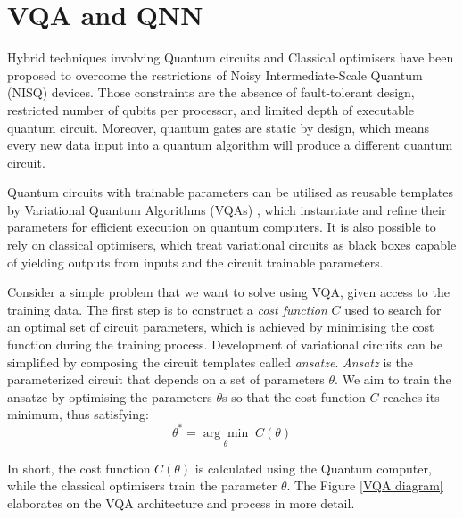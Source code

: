 \section{VQA and QNN}

Hybrid techniques involving Quantum circuits and Classical optimisers have been proposed to overcome the restrictions of Noisy Intermediate-Scale Quantum (NISQ) \cite{brooksQuantumSupremacyHunt2019} devices. 
Those constraints are the absence of fault-tolerant design, restricted number of qubits per processor, and limited depth of executable quantum circuit. 
Moreover, quantum gates are static by design, which means every new data input into a quantum algorithm will produce a different quantum circuit.

Quantum circuits with trainable parameters can be utilised as reusable templates by Variational Quantum Algorithms (VQAs) \cite{cerezo2021variational}, which instantiate and refine their parameters for efficient execution on quantum computers.
It is also possible to rely on classical optimisers, which treat variational circuits as black boxes capable of yielding outputs from inputs and the circuit trainable parameters.

Consider a simple problem that we want to solve using VQA, given access to the training data.
The first step is to construct a \textit{cost function} $C$ used to search for an optimal set of circuit parameters, which is achieved by minimising the cost function during the training process.
Development of variational circuits can be simplified by composing the circuit templates called \textit{ansatze}. 
\textit{Ansatz} is the parameterized circuit that depends on a set of parameters $\theta$. We aim to train the ansatze by optimising the parameters $\theta$s so that the cost function $C$ reaches its minimum, thus satisfying:
\begin{equation}
    \theta^* = \underset{\theta}{\arg \min} \;C(\theta)
    \label{optimize theta with ansatz}
\end{equation}

In short, the cost function $C(\theta)$ is calculated using the Quantum computer, while the classical optimisers train the parameter $\theta$. The Figure \ref{VQA diagram} elaborates on the VQA architecture and process in more detail.

